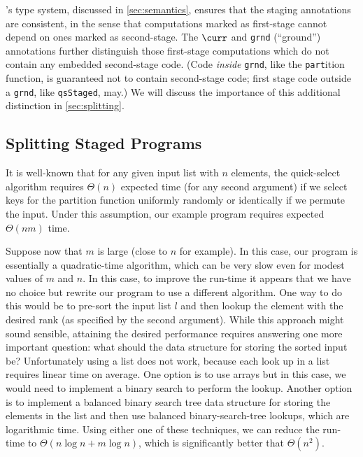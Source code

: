 \begin{abstrsyn}
\lang's type system, discussed in \ref{sec:semantics}, ensures that the staging
annotations are consistent, in the sense that computations marked as
first-stage cannot depend on ones marked as second-stage. The $\curr$ and
\texttt{grnd} (``ground'') annotations further distinguish those first-stage computations
which do not contain any embedded second-stage code. (Code \emph{inside}
\texttt{grnd}, like the \texttt{part}ition function, is guaranteed not to
contain second-stage code; first stage code outside a \texttt{grnd}, 
like \texttt{qsStaged}, may.) We will
discuss the importance of this additional distinction in \ref{sec:splitting}.



\subsection{Splitting Staged Programs}



It is well-known that for any given input list with $n$ elements, the
quick-select algorithm requires $\Theta(n)$ expected time (for any
second argument) if we select keys for the partition function
uniformly randomly or identically if we permute the input. Under this
assumption, our example program requires expected $\Theta(nm)$ time.

Suppose now that $m$ is large (close to $n$ for example).  In this
case, our program is essentially a quadratic-time algorithm, which can
be very slow even for modest values of $m$ and $n$. In this case, to
improve the run-time it appears that we have no choice but rewrite our
program to use a different algorithm.  One way to do this would be to
pre-sort the input list $l$ and then lookup the element with the
desired rank (as specified by the second argument).  While this
approach might sound sensible, attaining the desired performance
requires answering one more important question: what should the data
structure for storing the sorted input be?  Unfortunately using a list
does not work, because each look up in a list requires linear time on
average. One option is to use arrays but in this case, we would need
to implement a binary search to perform the lookup.  Another option is
to implement a balanced binary search tree data structure for storing
the elements in the list and then use balanced binary-search-tree
lookups, which are logarithmic time.  Using either one of these
techniques, we can reduce the run-time to $\Theta(n\log{n} + m\log{n})$,
which is significantly better that $\Theta(n^2)$.



\end{abstrsyn}
